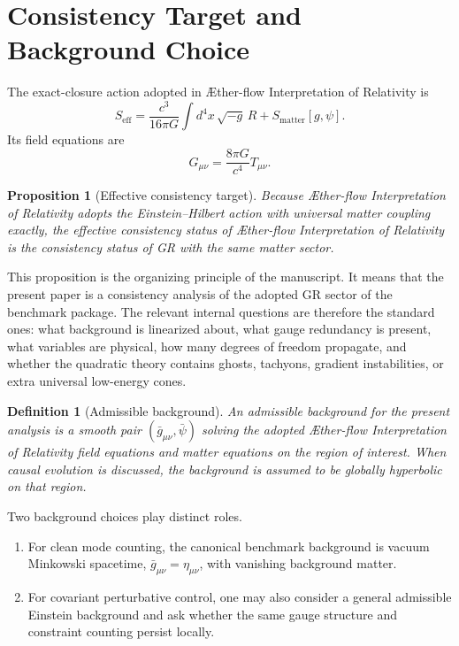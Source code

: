\documentclass[11pt]{article}
\newcommand{\Aflow}{\AE{}ther-flow}
\newcommand{\TheoryName}{\Aflow{} Interpretation of Relativity}
\newtheorem{definition}{Definition}
\newtheorem{proposition}{Proposition}
\begin{document}
\section{Consistency Target and Background Choice}

The exact-closure action adopted in \TheoryName{} is
\begin{equation}
S_{\mathrm{eff}}
=
\frac{c^3}{16\pi G}\int d^4x\,\sqrt{-g}\,R
+
S_{\mathrm{matter}}[g,\psi].
\label{eq:SA}
\end{equation}
Its field equations are
\begin{equation}
G_{\mu\nu}
=
\frac{8\pi G}{c^4}T_{\mu\nu}.
\label{eq:einstein}
\end{equation}

\begin{proposition}[Effective consistency target]
Because \TheoryName{} adopts the Einstein--Hilbert action with universal matter coupling exactly, the effective consistency status of \TheoryName{} is the consistency status of GR with the same matter sector.
\end{proposition}

This proposition is the organizing principle of the manuscript. It means that the present paper is a consistency analysis of the adopted GR sector of the benchmark package. The relevant internal questions are therefore the standard ones: what background is linearized about, what gauge redundancy is present, what variables are physical, how many degrees of freedom propagate, and whether the quadratic theory contains ghosts, tachyons, gradient instabilities, or extra universal low-energy cones.

\begin{definition}[Admissible background]
An admissible background for the present analysis is a smooth pair \((\bar g_{\mu\nu},\bar\psi)\) solving the adopted \TheoryName{} field equations and matter equations on the region of interest. When causal evolution is discussed, the background is assumed to be globally hyperbolic on that region.
\end{definition}

Two background choices play distinct roles.
\begin{enumerate}
    \item For clean mode counting, the canonical benchmark background is vacuum Minkowski spacetime, \(\bar g_{\mu\nu}=\eta_{\mu\nu}\), with vanishing background matter.
    \item For covariant perturbative control, one may also consider a general admissible Einstein background and ask whether the same gauge structure and constraint counting persist locally.
\end{enumerate}
\end{document}
